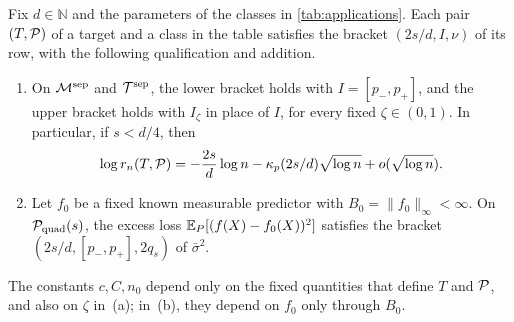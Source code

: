 \begin{corollary}[Applications]\label{cor:applications}%
\label{cor:mar-ate}\label{cor:covariances}\label{cor:wald}%
\label{cor:overlap-effect}
Fix $d\in\mathbb N$ and the parameters of the classes in
\cref{tab:applications}. Each pair $(T,\mathcal P)$ of a target and a
class in the table satisfies the bracket $(2s/d,I,\nu)$ of its row,
with the following qualification and addition.
\begin{enumerate}[label=(\alph*)]
\item On $\mathcal M^{\rm sep}$ and $\mathcal T^{\rm sep}$, the lower
bracket holds with $I=[p_-,p_+]$, and the upper bracket holds with
$I_\zeta$ in place of $I$, for every fixed $\zeta\in(0,1)$. In
particular, if $s<d/4$, then
\begin{equation}\label{eq:sep-log-risk}
 \log r_n(T,\mathcal P)=-\frac{2s}d\log n-\kappa_p(2s/d)\sqrt{\log n}
 +o(\sqrt{\log n}).
\end{equation}
\item Let $f_0$ be a fixed known measurable predictor with
$B_0=\|f_0\|_\infty<\infty$. On $\mathcal P_{\rm quad}(s)$, the excess loss
$\mathbb E_P[(f(X)-f_0(X))^2]$ satisfies the bracket
$(2s/d,[p_-,p_+],2q_s)$ of $\bar\sigma^2$.
\end{enumerate}
The constants $c,C,n_0$ depend only on the fixed quantities that define
$T$ and $\mathcal P$, and also on $\zeta$ in~(a); in~(b), they depend on
$f_0$ only through $B_0$.
\end{corollary}


